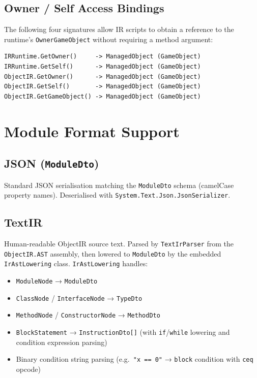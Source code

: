 \documentclass[11pt,a4paper]{article}
\newcommand{\code}[1]{\texttt{\small #1}}
\newcommand{\typename}[1]{\textcolor{typecolor}{\texttt{\small #1}}}
\begin{document}
\subsection{Owner / Self Access Bindings}

The following four signatures allow IR scripts to obtain a reference to the
runtime's \code{OwnerGameObject} without requiring a method argument:

\begin{lstlisting}[style=cs]
IRRuntime.GetOwner()     -> ManagedObject (GameObject)
IRRuntime.GetSelf()      -> ManagedObject (GameObject)
ObjectIR.GetOwner()      -> ManagedObject (GameObject)
ObjectIR.GetSelf()       -> ManagedObject (GameObject)
ObjectIR.GetGameObject() -> ManagedObject (GameObject)
\end{lstlisting}

\section{Module Format Support}

\subsection{JSON (\texttt{ModuleDto})}

Standard JSON serialisation matching the \typename{ModuleDto} schema (camelCase
property names). Deserialised with \code{System.Text.Json.JsonSerializer}.

\subsection{TextIR}

Human-readable ObjectIR source text. Parsed by \typename{TextIrParser} from the
\code{ObjectIR.AST} assembly, then lowered to \typename{ModuleDto} by the embedded
\typename{IrAstLowering} class. \typename{IrAstLowering} handles:

\begin{itemize}[leftmargin=2em, noitemsep]
  \item \code{ModuleNode} → \typename{ModuleDto}
  \item \code{ClassNode} / \code{InterfaceNode} → \typename{TypeDto}
  \item \code{MethodNode} / \code{ConstructorNode} → \typename{MethodDto}
  \item \code{BlockStatement} → \typename{InstructionDto}\code{[]}
        (with \code{if}/\code{while} lowering and condition expression parsing)
  \item Binary condition string parsing (e.g.\ \texttt{"x == 0"} → \code{block}
        condition with \code{ceq} opcode)
\end{itemize}
\end{document}
